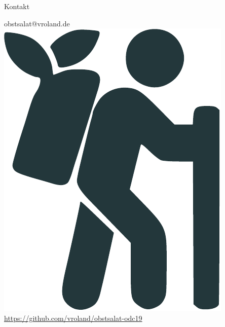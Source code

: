 \documentclass[13pt, usenames, dvipsnames]{beamer}
\begin{document}
\begin{frame}{Kontakt}
    \begin{center}
        obstsalat@vroland.de\\
        \bigskip
        \includegraphics[width=.25\textwidth]{colored-logo.pdf}
        \bigskip
        \url{https://github.com/vroland/obstsalat-odc19}
    \end{center}
\end{frame}
\end{document}
